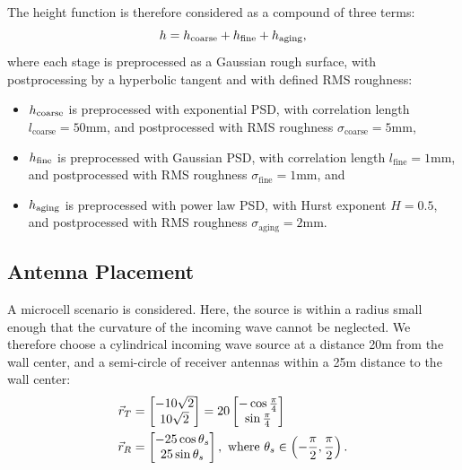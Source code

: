 \documentclass[lettersize,journal]{IEEEtran}
\begin{document}
The height function is therefore considered as a compound of three terms:
\setcounter{equation}{0}
\begin{equation}
   h = h_{\text{coarse}} + h_{\text{fine}} + h_{\text{aging}},
      \label{eq:heightModel}
\end{equation}
where each stage is preprocessed as a Gaussian rough surface, with postprocessing by
a hyperbolic tangent and with defined RMS roughness:
\begin{itemize}
   \item $h_{\text{coarse}}$ is preprocessed with exponential
      PSD, with correlation length $l_{\text{coarse}} = 50\text{mm}$, and
      postprocessed with RMS roughness $\sigma_{\text{coarse}} = 5\text{mm}$,
   \item $h_{\text{fine}}$ is preprocessed with Gaussian PSD,
      with correlation length $l_{\text{fine}} = 1\text{mm}$, and postprocessed with
      RMS roughness $\sigma_{\text{fine}} = 1 \text{mm}$, and 
   \item $h_{\text{aging}}$ is preprocessed with power law PSD, with Hurst exponent
      $H=0.5$, and postprocessed with RMS roughness $\sigma_{\text{aging}} = 2
      \text{mm}$.
\end{itemize}
\subsection{Antenna Placement}
A microcell scenario is considered. Here, the source is within a radius small enough
that the curvature of the incoming wave cannot be neglected. We therefore choose a
cylindrical incoming wave source at a distance 20m from the wall center, and a
semi-circle of receiver antennas within a 25m distance to the wall center:
\begin{subequations}
\begin{align}
   \vec{r}_{T} &= \begin{bmatrix} - 10 \sqrt{2} \\ 10 \sqrt{2} \end{bmatrix} =
      20 \begin{bmatrix} - \cos\frac{\pi}{4} 
      \\ \sin\frac{\pi}{4} \end{bmatrix} \\ 
   \vec{r}_{R} &= \begin{bmatrix} - 25 \cos\theta_s \\ 25 \sin\theta_s \end{bmatrix},
      \text{ where } \theta_s \in \left(-\frac{\pi}{2}, \frac{\pi}{2}\right).
\end{align}
\end{subequations}
\end{document}
